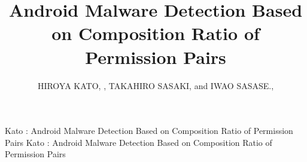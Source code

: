 \documentclass{ieeeaccess}
\newcommand{\TI}{Android Malware Detection Based on Composition Ratio of Permission Pairs}
\begin{document}

\title{Android Malware Detection Based on Composition Ratio of Permission Pairs} 

\author{
  \uppercase{Hiroya Kato}, ,
  \uppercase{Takahiro Sasaki},
  and \uppercase{Iwao Sasase}., }
\address[1]{Department of Information and Computer Science, Faculty of Science and Technology, Keio University 3-14-1 Hiyoshi, Kohoku, Yokohama, Kanagawa 223-8522, Japan}

\markboth
{Kato \headeretal: \TI}
{Kato \headeretal: \TI}


\begingroup
\newlength{\xfigwd}
\setlength{\xfigwd}{\textwidth}
\end{document}
